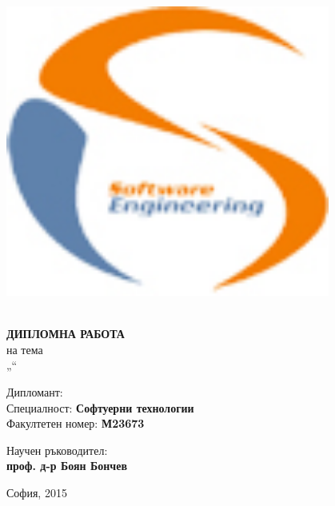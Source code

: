 \begin{titlepage}
\begin{center}
\begin{minipage}{0.15\textwidth}
\begin{flushright}
        \includegraphics[width=0.8\textwidth]{images/logo-dse.png}
      \end{flushright}
    \end{minipage}
    \\[3cm]
    {\Huge \uppercase{\textbf{Дипломна работа}}}\\[1cm]
    {\large на тема}\\[1cm]
    {\LARGE „\thetitle“}
  \end{center}
  
  \vfill
  
  \begin{flushleft}
    Дипломант: \textbf{\theauthor}\\
    Специалност: \textbf{Софтуерни технологии}\\
    Факултетен номер: \textbf{М23673}
  \end{flushleft}
  
  \vspace{0.5cm}
  
  \begin{flushright}
    Научен ръководител:\\
    \textbf{проф. д-р Боян Бончев}
  \end{flushright}
  
  \vspace{1cm}
  
  \begin{center}
    София, 2015
  \end{center}
\end{titlepage}
